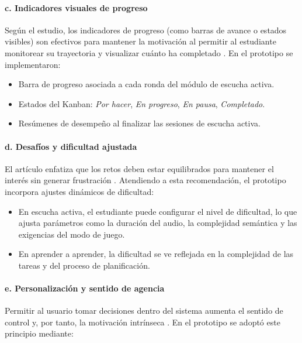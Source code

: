 \paragraph{c. Indicadores visuales de progreso}

Según el estudio, los indicadores de progreso (como barras de avance o estados visibles) son efectivos para mantener la motivación al permitir al estudiante monitorear su trayectoria y visualizar cuánto ha completado \cite{watini2023gamification}. En el prototipo se implementaron:

\begin{itemize}
    \item Barra de progreso asociada a cada ronda del módulo de escucha activa.
    \item Estados del Kanban: \textit{Por hacer}, \textit{En progreso}, \textit{En pausa}, \textit{Completado}.
    \item Resúmenes de desempeño al finalizar las sesiones de escucha activa.
\end{itemize}

\paragraph{d. Desafíos y dificultad ajustada}

El artículo enfatiza que los retos deben estar equilibrados para mantener el interés sin generar frustración \cite{watini2023gamification}. Atendiendo a esta recomendación, el prototipo incorpora ajustes dinámicos de dificultad:

\begin{itemize}
    \item En escucha activa, el estudiante puede configurar el nivel de dificultad, lo que ajusta parámetros como la duración del audio, la complejidad semántica y las exigencias del modo de juego.
    \item En aprender a aprender, la dificultad se ve reflejada en la complejidad de las tareas y del proceso de planificación.
\end{itemize}

\paragraph{e. Personalización y sentido de agencia}

Permitir al usuario tomar decisiones dentro del sistema aumenta el sentido de control y, por tanto, la motivación intrínseca \cite{watini2023gamification}. En el prototipo se adoptó este principio mediante:

